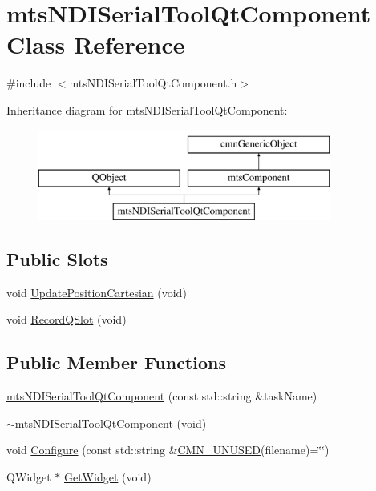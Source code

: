 \hypertarget{classmts_n_d_i_serial_tool_qt_component}{}\section{mts\+N\+D\+I\+Serial\+Tool\+Qt\+Component Class Reference}
\label{classmts_n_d_i_serial_tool_qt_component}


{\ttfamily \#include $<$mts\+N\+D\+I\+Serial\+Tool\+Qt\+Component.\+h$>$}

Inheritance diagram for mts\+N\+D\+I\+Serial\+Tool\+Qt\+Component\+:\begin{figure}[H]
\begin{center}
\leavevmode
\includegraphics[height=3.000000cm]{dc/d97/classmts_n_d_i_serial_tool_qt_component}
\end{center}
\end{figure}
\subsection*{Public Slots}
\begin{DoxyCompactItemize}
\item 
void \hyperlink{classmts_n_d_i_serial_tool_qt_component_a9bc1bd4a013f0635d0b7f353866a2f0f}{Update\+Position\+Cartesian} (void)
\item 
void \hyperlink{classmts_n_d_i_serial_tool_qt_component_a91030077c7e421792da63ee60d57987f}{Record\+Q\+Slot} (void)
\end{DoxyCompactItemize}
\subsection*{Public Member Functions}
\begin{DoxyCompactItemize}
\item 
\hyperlink{classmts_n_d_i_serial_tool_qt_component_a936a395717f665487020236f9937fe89}{mts\+N\+D\+I\+Serial\+Tool\+Qt\+Component} (const std\+::string \&task\+Name)
\item 
\hyperlink{classmts_n_d_i_serial_tool_qt_component_a15ac6f59c33f4a578a047dab9a2fb2ed}{$\sim$mts\+N\+D\+I\+Serial\+Tool\+Qt\+Component} (void)
\item 
void \hyperlink{classmts_n_d_i_serial_tool_qt_component_a8e422967c0f7a50a5c912c5b1fdf94d0}{Configure} (const std\+::string \&\hyperlink{cmn_portability_8h_a021894e2626935fa2305434b1e893ff6}{C\+M\+N\+\_\+\+U\+N\+U\+S\+E\+D}(filename)=\char`\"{}\char`\"{})
\item 
Q\+Widget $\ast$ \hyperlink{classmts_n_d_i_serial_tool_qt_component_afa66d85f0d5b76b7fb5741b8e958eed5}{Get\+Widget} (void)
\end{DoxyCompactItemize}
